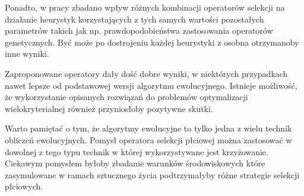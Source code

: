 \documentclass[./FM_mgr.tex]{subfiles}
\begin{document}
Ponadto, w pracy zbadano wpływ różnych kombinacji operatorów selekcji na działanie heurystyk korzystających z tych samych wartości pozostałych parametrów takich jak np. prawdopodobieństwa zastosowania operatorów genetycznych.
Być może po dostrojeniu każdej heurystyki z osobna otrzymanoby inne wyniki.

Zaproponowane operatory dały dość dobre wyniki, w niektórych przypadkach nawet lepsze od podstawowej wersji algorytmu ewolucyjnego.
Istnieje możliwość, że wykorzystanie opisanych rozwiązań do problemów optymalizacji wielokryterialnej również przyniosłoby pozytywne skutki.

Warto pamiętać o tym, że algorytmy ewolucyjne to tylko jedna z wielu technik obliczeń ewolucyjnych.
Pomysł operatora selekcji płciowej można zastosować w dowolnej z tego typu technik w której wykorzystywane jest krzyżowanie.
Ciekawym pomysłem byłoby zbadanie warunków środowiskowych które zasymulowane w ramach sztucznego życia podtrzymałyby różne strategie selekcji płciowych.
\end{document}
